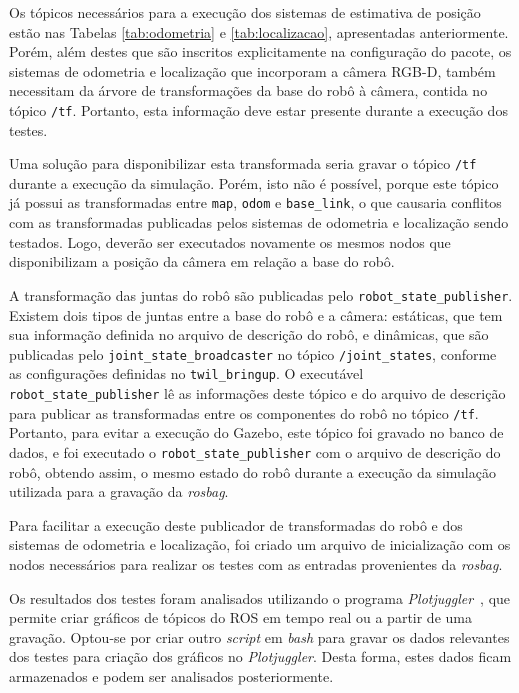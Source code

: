 \documentclass[repeatfields,xlists,xpacks,oneside,yearsonly]{ufrgscca}
\begin{document}
Os tópicos necessários para a execução dos sistemas de estimativa de
posição estão nas Tabelas \ref{tab:odometria} e
\ref{tab:localizacao}, apresentadas anteriormente. Porém, além destes
que são inscritos explicitamente na configuração do pacote, os
sistemas de odometria e localização que incorporam a câmera RGB-D,
também necessitam da árvore de transformações da base do robô à
câmera, contida no tópico \texttt{/tf}. Portanto, esta informação
deve estar presente durante a execução dos testes.

Uma solução para disponibilizar esta transformada seria gravar o
tópico \texttt{/tf} durante a execução da simulação. Porém, isto não
é possível, porque este tópico já possui as transformadas entre
\texttt{map}, \texttt{odom} e \texttt{base\_link}, o que causaria
conflitos com as transformadas publicadas pelos sistemas de odometria
e localização sendo testados. Logo, deverão ser executados novamente
os mesmos nodos que disponibilizam a posição da câmera em relação a
base do robô.

A transformação das juntas do robô são publicadas pelo
\texttt{robot\_state\_publisher}. Existem dois tipos de juntas entre
a base do robô e a câmera: estáticas, que tem sua informação definida
no arquivo de descrição do robô, e dinâmicas, que são publicadas pelo
\texttt{joint\_state\_broadcaster} no tópico \texttt{/joint\_states},
conforme as configurações definidas no \texttt{twil\_bringup}. O
executável \texttt{robot\_state\_publisher} lê as informações deste
tópico e do arquivo de descrição para publicar as transformadas entre
os componentes do robô no tópico \texttt{/tf}. Portanto, para evitar
a execução do Gazebo, este tópico foi gravado no banco de dados, e
foi executado o \texttt{robot\_state\_publisher} com o arquivo de
descrição do robô, obtendo assim, o mesmo estado do robô durante a
execução da simulação utilizada para a gravação da \textit{rosbag}.

Para facilitar a execução deste publicador de transformadas do robô e
dos sistemas de odometria e localização, foi criado um arquivo de
inicialização com os nodos necessários para realizar os testes com as
entradas provenientes da \textit{rosbag}.

Os resultados dos testes foram analisados utilizando o programa
\textit{Plotjuggler}~\cite{plotjuggler}, que permite criar gráficos
de tópicos do ROS em tempo real ou a partir de uma gravação. Optou-se
por criar outro \textit{script} em \textit{bash} para gravar os dados
relevantes dos testes para criação dos gráficos no
\textit{Plotjuggler}. Desta forma, estes dados ficam armazenados e
podem ser analisados posteriormente.
\end{document}
